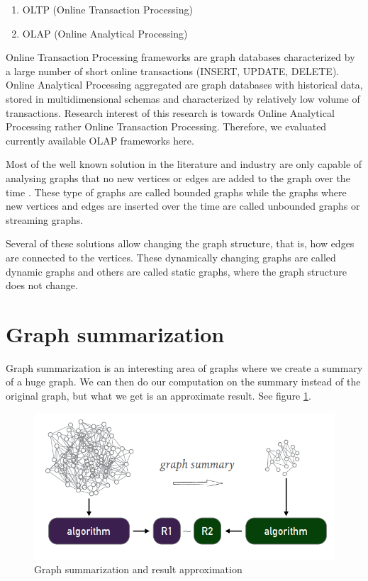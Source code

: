 \documentclass[conference]{IEEEtran}
\begin{document}
\begin{enumerate}
\item OLTP (Online Transaction Processing)
\item OLAP (Online Analytical Processing)
\end{enumerate}

Online Transaction Processing frameworks are graph databases characterized by a large number of short online transactions (INSERT, UPDATE, DELETE). Online Analytical Processing aggregated are graph databases with historical data, stored in multidimensional schemas and characterized by relatively low volume of transactions. Research interest of this research is towards Online Analytical Processing rather Online Transaction Processing. Therefore, we evaluated currently available OLAP frameworks here.

Most of the well known solution in the literature and industry are only capable of analysing graphs that no new vertices or edges are added to the graph over the time\cite{Pregel} \cite{Graphlab}. These type of graphs are called bounded graphs while the graphs where new vertices and edges are inserted  over the time are called unbounded graphs or streaming graphs\cite{Fennel}\cite{S-PowerGraph}.


Several of these solutions allow changing the graph structure, that is, how edges are connected to the vertices. These dynamically changing graphs are called dynamic graphs and others are called static graphs, where the graph structure does not change\cite{X-stream}.


\section{Graph summarization}
Graph summarization is an interesting area of graphs where we create a summary of a huge graph. We can then do our computation on the summary instead of the original graph, but what we get is an approximate result. See figure \ref{fig:Graph summarization}. 

\begin{figure}[!b]
\centering
\includegraphics[width=\linewidth]{../images/image02}
\caption{Graph summarization and result approximation}
\label{fig:Graph summarization}
\end{figure}
\end{document}
